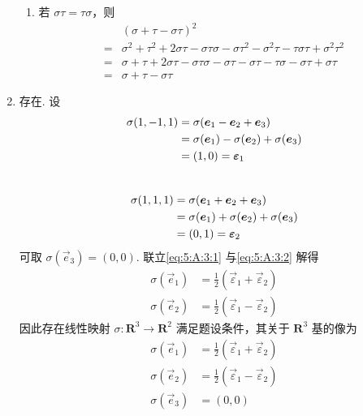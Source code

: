 \begin{enumerate}
\begin{enumerate}
              \item 若 $ \sigma \tau = \tau \sigma $，则
                    \begin{align*}
                            & (\sigma + \tau - \sigma \tau)^2                                                                                             \\
                        ={} & \sigma^2 + \tau^2 + 2 \sigma \tau - \sigma \tau \sigma - \sigma \tau^2 - \sigma^2 \tau - \tau \sigma \tau + \sigma^2 \tau^2 \\
                        ={} & \sigma + \tau + 2 \sigma \tau - \sigma \tau \sigma - \sigma \tau - \sigma \tau - \tau \sigma - \sigma \tau + \sigma \tau    \\
                        ={} & \sigma + \tau - \sigma \tau
                    \end{align*}
          \end{enumerate}

    \item 存在. 设
          \begin{align}
              \sigma(1, -1, 1) & = \sigma(\vec{e}_1 - \vec{e}_2 + \vec{e}_3) \notag                 \\
                               & = \sigma(\vec{e}_1) - \sigma(\vec{e}_2) + \sigma(\vec{e}_3) \notag \\
                               & = (1, 0) = \vec{\varepsilon}_1 \label{eq:5:A:3:1}
          \end{align} \\
          \begin{align}
              \sigma(1, 1, 1) & = \sigma(\vec{e}_1 + \vec{e}_2 + \vec{e}_3) \notag                 \\
                              & = \sigma(\vec{e}_1) + \sigma(\vec{e}_2) + \sigma(\vec{e}_3) \notag \\
                              & = (0, 1) = \vec{\varepsilon}_2 \label{eq:5:A:3:2}
          \end{align}
          可取 $ \sigma(\vec{e}_3) = (0, 0) $. 联立\autoref{eq:5:A:3:1} 与\autoref{eq:5:A:3:2} 解得
          \begin{align*}
              \sigma(\vec{e}_1) & = \frac{1}{2} (\vec{\varepsilon}_1 + \vec{\varepsilon}_2) \\
              \sigma(\vec{e}_2) & = \frac{1}{2} (\vec{\varepsilon}_1 - \vec{\varepsilon}_2)
          \end{align*}
          因此存在线性映射 $ \sigma : \mathbf{R}^3 \to \mathbf{R}^2 $ 满足题设条件，其关于 $ \mathbf{R}^3 $ 基的像为
          \begin{align*}
              \sigma(\vec{e}_1) & = \frac{1}{2} (\vec{\varepsilon}_1 + \vec{\varepsilon}_2) \\
              \sigma(\vec{e}_2) & = \frac{1}{2} (\vec{\varepsilon}_1 - \vec{\varepsilon}_2) \\
              \sigma(\vec{e}_3) & = (0, 0)
          \end{align*}


\end{enumerate}
